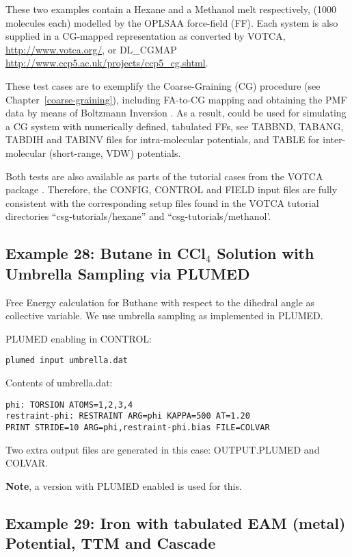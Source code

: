 These two examples contain a Hexane and a Methanol melt respectively,
(1000 molecules each) modelled by the OPLSAA force-field (FF).
Each system is also supplied in a CG-mapped representation as converted
by VOTCA, \href{http://www.votca.org/}{http://www.votca.org/},
or DL\_CGMAP \href{http://www.ccp5.ac.uk/projects/ccp5\_cg.shtml}{http://www.ccp5.ac.uk/projects/ccp5\_cg.shtml}.

These test cases are to exemplify the Coarse-Graining (CG) procedure
(see Chapter~\ref{coarse-graining}), including FA-to-CG mapping and
obtaining the PMF data by means of Boltzmann Inversion \cite{reith-03a}.
As a result, \D could be used for simulating a CG system with numerically
defined, tabulated FFs, see TABBND, TABANG, TABDIH and TABINV files for
intra-molecular potentials, and TABLE for inter-molecular (short-range, VDW)
potentials.

Both tests are also available as parts of the tutorial cases from the
VOTCA package \cite{ruhle-09a}.  Therefore, the CONFIG, CONTROL and FIELD
input files are fully consistent with the corresponding setup files found
in the VOTCA tutorial directories ``csg-tutorials/hexane'' and ``csg-tutorials/methanol'.

\subsection{Example 28: Butane in CCl$_{4}$ Solution with Umbrella Sampling via PLUMED}

Free Energy calculation for Buthane with respect to the dihedral angle as
collective variable.  We use umbrella sampling as implemented in PLUMED.

PLUMED enabling in CONTROL:
\begin{lstlisting}
plumed input umbrella.dat
\end{lstlisting}

Contents of umbrella.dat:
\begin{lstlisting}
phi: TORSION ATOMS=1,2,3,4
restraint-phi: RESTRAINT ARG=phi KAPPA=500 AT=1.20
PRINT STRIDE=10 ARG=phi,restraint-phi.bias FILE=COLVAR
\end{lstlisting}

Two extra output files are generated in this case: OUTPUT.PLUMED and COLVAR.

{\bf Note}, a \D version with PLUMED enabled is used for this.

\subsection{Example 29: Iron with tabulated EAM (metal) Potential, TTM and Cascade}

